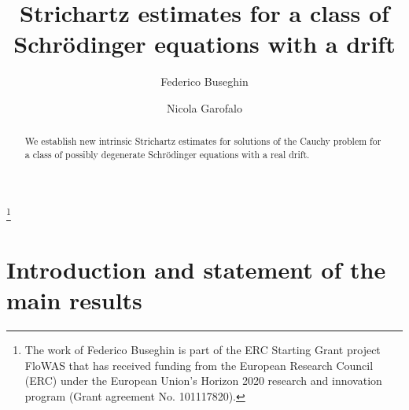 \documentclass[11pt,letter]{amsart}
\numberwithin{equation}{section}
\numberwithin{equation}{section}
\begin{document}

	
	
\title[]{Strichartz estimates for a class of Schr\"odinger  equations with a drift} 
	
	
	
	
	
\date{}
	
\begin{abstract}
We establish new intrinsic Strichartz estimates for solutions of the Cauchy problem for a class of possibly degenerate Schr\"odinger equations with a real drift. 
\end{abstract}
	
\author{Federico Buseghin}
	
\address{Laboratoire AGM\\ CY Cergy Paris Universit\'e\\ 2 avenue Adolphe Chauvin, 95300 Pontoise, France}
\vskip 0.2in
	


\author{Nicola Garofalo}
\address{School of Mathematical and Statistical Sciences\\ Arizona State University}

\thanks{The work of Federico Buseghin is part of the ERC Starting Grant project FloWAS that has received funding from the European Research Council (ERC) under the European Union's Horizon 2020 research and innovation program (Grant agreement No. 101117820).}



	
\maketitle
	
\tableofcontents


\section{Introduction and statement of the main results}\label{S:intro}
\end{document}
